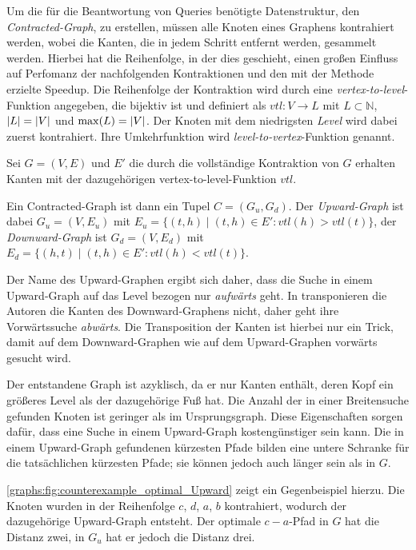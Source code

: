 Um die für die Beantwortung von Queries benötigte Datenstruktur, den \emph{Contracted-Graph}, zu erstellen, müssen alle Knoten eines Graphens kontrahiert werden, wobei die Kanten, die in jedem Schritt entfernt werden, gesammelt werden.
Hierbei hat die Reihenfolge, in der dies geschieht, einen großen Einfluss auf Perfomanz der nachfolgenden Kontraktionen und den mit der Methode erzielte Speedup.
Die Reihenfolge der Kontraktion wird durch eine \emph{vertex-to-level}-Funktion angegeben, die bijektiv ist und definiert als ${vtl} \colon V \to L$ mit $L \subset \mathbb{N}$, $\abs{L} = \abs{V}$ und $\max(L) = \abs{V}$.
Der Knoten mit dem niedrigsten \emph{Level} wird dabei zuerst kontrahiert.
Ihre Umkehrfunktion wird \emph{level-to-vertex}-Funktion genannt.

\begin{definition}
    Sei $G = (V, E)$ und $E'$ die durch die vollständige Kontraktion von $G$ erhalten Kanten mit der dazugehörigen vertex-to-level-Funktion ${vtl}$.

    Ein Contracted-Graph ist dann ein Tupel $C = (G_u, G_d)$. Der \emph{Upward-Graph} ist dabei $G_u = (V, E_u)$ mit $E_u = \{ (t, h) \mid (t, h) \in E' \colon {vtl}(h) > {vtl}(t) \}$, der \emph{Downward-Graph} ist $G_d = (V, E_d)$ mit $E_d = \{ (h, t) \mid (t, h) \in E' \colon {vtl}(h) < {vtl}(t) \}$.
\end{definition}

Der Name des Upward-Graphen ergibt sich daher, dass die Suche in einem Upward-Graph auf das Level bezogen nur \emph{aufwärts} geht.
In \cite{geisberger2008contraction} transponieren die Autoren die Kanten des Downward-Graphens nicht, daher geht ihre Vorwärtssuche \emph{abwärts}.
Die Transposition der Kanten ist hierbei nur ein Trick, damit auf dem Downward-Graphen wie auf dem Upward-Graphen vorwärts gesucht wird.

Der entstandene Graph ist azyklisch, da er nur Kanten enthält, deren Kopf ein größeres Level als der dazugehörige Fuß hat.
Die Anzahl der in einer Breitensuche gefunden Knoten ist geringer als im Ursprungsgraph.
Diese Eigenschaften sorgen dafür, dass eine Suche in einem Upward-Graph kostengünstiger sein kann.
Die in einem Upward-Graph gefundenen kürzesten Pfade bilden eine untere Schranke für die tatsächlichen kürzesten Pfade; sie können jedoch auch länger sein als in $G$.

\autoref{graphs:fig:counterexample_optimal_Upward} zeigt ein Gegenbeispiel hierzu.
Die Knoten wurden in der Reihenfolge $c$, $d$, $a$, $b$ kontrahiert, wodurch der dazugehörige Upward-Graph entsteht.
Der optimale $c-a$-Pfad in $G$ hat die Distanz zwei, in $G_u$ hat er jedoch die Distanz drei.

